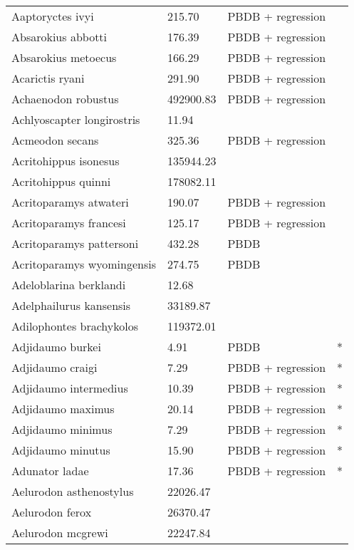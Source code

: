\documentclass{article}
\begin{document}
\begin{center}
\begin{longtable}{p{} p{} p{} p{}}
    \hline \hline
    \endlastfoot
    Aaptoryctes ivyi & 215.70 & PBDB + regression &  \\ 
    Absarokius abbotti & 176.39 & PBDB + regression &  \\ 
    Absarokius metoecus & 166.29 & PBDB + regression &  \\ 
    Acarictis ryani & 291.90 & PBDB + regression &  \\ 
    Achaenodon robustus & 492900.83 & PBDB + regression &  \\ 
    Achlyoscapter longirostris & 11.94 & \cite{Tomiya2013} &  \\ 
    Acmeodon secans & 325.36 & PBDB + regression &  \\ 
    Acritohippus isonesus & 135944.23 & \cite{Tomiya2013} &  \\ 
    Acritohippus quinni & 178082.11 & \cite{Tomiya2013} &  \\ 
    Acritoparamys atwateri & 190.07 & PBDB + regression &  \\ 
    Acritoparamys francesi & 125.17 & PBDB + regression &  \\ 
    Acritoparamys pattersoni & 432.28 & PBDB &  \\ 
    Acritoparamys wyomingensis & 274.75 & PBDB &  \\ 
    Adeloblarina berklandi & 12.68 & \cite{Tomiya2013} &  \\ 
    Adelphailurus kansensis & 33189.87 & \cite{Tomiya2013} &  \\ 
    Adilophontes brachykolos & 119372.01 & \cite{Tomiya2013} &  \\ 
    Adjidaumo burkei & 4.91 & PBDB & * \\ 
    Adjidaumo craigi & 7.29 & PBDB + regression & * \\ 
    Adjidaumo intermedius & 10.39 & PBDB + regression & * \\ 
    Adjidaumo maximus & 20.14 & PBDB + regression & * \\ 
    Adjidaumo minimus & 7.29 & PBDB + regression & * \\ 
    Adjidaumo minutus & 15.90 & PBDB + regression & * \\ 
    Adunator ladae & 17.36 & PBDB + regression & * \\ 
    Aelurodon asthenostylus & 22026.47 & \cite{Tomiya2013} &  \\ 
    Aelurodon ferox & 26370.47 & \cite{Tomiya2013} &  \\ 
    Aelurodon mcgrewi & 22247.84 & \cite{Tomiya2013} &  \\ 

\end{longtable}
\end{center}
\end{document}
